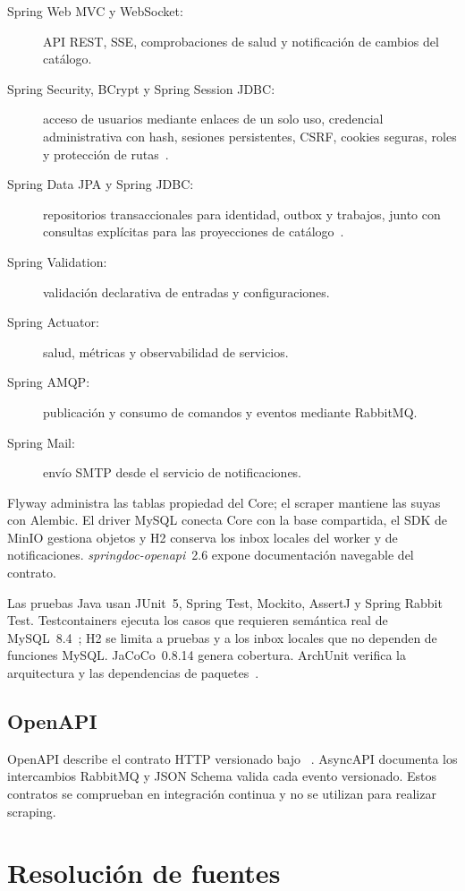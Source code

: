 \begin{description}
	\item[Spring Web MVC y WebSocket:] API REST, SSE, comprobaciones de salud y notificación de cambios del catálogo.
	\item[Spring Security, BCrypt y Spring Session JDBC:] acceso de usuarios mediante enlaces de un solo uso, credencial administrativa con hash, sesiones persistentes, CSRF, cookies seguras, roles y protección de rutas~\cite{springsession}.
	\item[Spring Data JPA y Spring JDBC:] repositorios transaccionales para identidad, outbox y trabajos, junto con consultas explícitas para las proyecciones de catálogo~\cite{springdatajpa}.
	\item[Spring Validation:] validación declarativa de entradas y configuraciones.
	\item[Spring Actuator:] salud, métricas y observabilidad de servicios.
	\item[Spring AMQP:] publicación y consumo de comandos y eventos mediante RabbitMQ.
	\item[Spring Mail:] envío SMTP desde el servicio de notificaciones.
\end{description}

Flyway administra las tablas propiedad del Core; el scraper mantiene las suyas con Alembic. El driver MySQL conecta Core con la base compartida, el SDK de MinIO gestiona objetos y H2 conserva los inbox locales del worker y de notificaciones. \emph{springdoc-openapi}~2.6 expone documentación navegable del contrato.

Las pruebas Java usan JUnit~5, Spring Test, Mockito, AssertJ y Spring Rabbit Test. Testcontainers ejecuta los casos que requieren semántica real de MySQL~8.4~\cite{testcontainers}; H2 se limita a pruebas y a los inbox locales que no dependen de funciones MySQL. JaCoCo~0.8.14 genera cobertura. ArchUnit verifica la arquitectura y las dependencias de paquetes~\cite{archunit}.

\subsection{OpenAPI}

OpenAPI describe el contrato HTTP versionado bajo ~\cite{openapi}. AsyncAPI documenta los intercambios RabbitMQ y JSON Schema valida cada evento versionado. Estos contratos se comprueban en integración continua y no se utilizan para realizar scraping.

\section{Resolución de fuentes}

